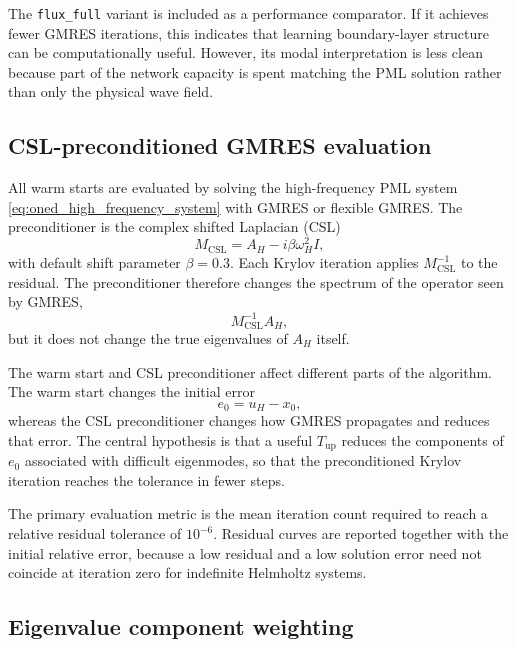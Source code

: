 The \texttt{flux\_full} variant is included as a performance comparator. If it
achieves fewer GMRES iterations, this indicates that learning boundary-layer
structure can be computationally useful. However, its modal interpretation is
less clean because part of the network capacity is spent matching the PML
solution rather than only the physical wave field.


\subsection{CSL-preconditioned GMRES evaluation}
\label{subsec:methodology_1d_csl}

All warm starts are evaluated by solving the high-frequency PML system
\eqref{eq:oned_high_frequency_system} with GMRES or flexible GMRES. The
preconditioner is the complex shifted Laplacian (CSL)
\begin{equation}
    M_{\mathrm{CSL}}
    =
    A_H - i\beta \omega_H^2 I,
    \label{eq:oned_csl_preconditioner}
\end{equation}
with default shift parameter $\beta = 0.3$. Each Krylov iteration applies
$M_{\mathrm{CSL}}^{-1}$ to the residual. The preconditioner therefore changes
the spectrum of the operator seen by GMRES,
\begin{equation}
    M_{\mathrm{CSL}}^{-1} A_H,
    \label{eq:oned_preconditioned_operator}
\end{equation}
but it does not change the true eigenvalues of $A_H$ itself.

The warm start and CSL preconditioner affect different parts of the algorithm.
The warm start changes the initial error
\[
    e_0 = u_H - x_0,
\]
whereas the CSL preconditioner changes how GMRES propagates and reduces that
error. The central hypothesis is that a useful $T_{\mathrm{up}}$ reduces the
components of $e_0$ associated with difficult eigenmodes, so that the
preconditioned Krylov iteration reaches the tolerance in fewer steps.

The primary evaluation metric is the mean iteration count required to reach
a relative residual tolerance of $10^{-6}$. Residual curves are reported
together with the initial relative error, because a low residual and a low
solution error need not coincide at iteration zero for indefinite Helmholtz
systems.


\subsection{Eigenvalue component weighting}
\label{subsec:methodology_1d_component_weighting}

